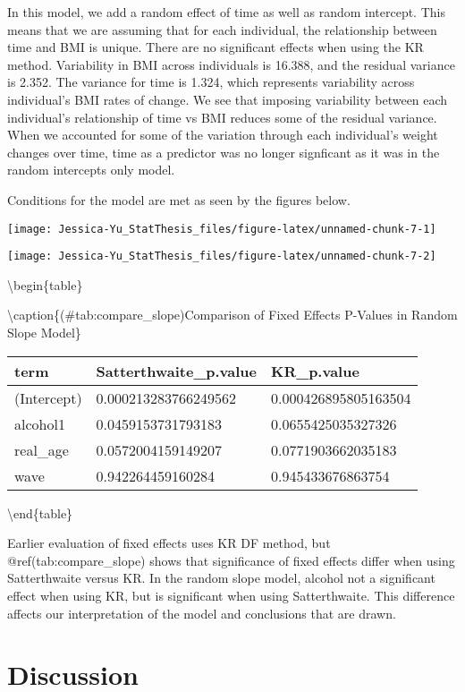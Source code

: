 \documentclass[12pt, twoside]{amherstthesis}
\begin{document}
In this model, we add a random effect of time as well as random intercept. This means that we are assuming that for each individual, the relationship between time and BMI is unique. There are no significant effects when using the KR method. Variability in BMI across individuals is 16.388, and the residual variance is 2.352. The variance for time is 1.324, which represents variability across individual's BMI rates of change. We see that imposing variability between each individual's relationship of time vs BMI reduces some of the residual variance. When we accounted for some of the variation through each individual's weight changes over time, time as a predictor was no longer signficant as it was in the random intercepts only model.

Conditions for the model are met as seen by the figures below.
\begin{center}\texttt{[image: Jessica-Yu\_StatThesis\_files/figure-latex/unnamed-chunk-7-1]} \end{center}
\begin{center}\texttt{[image: Jessica-Yu\_StatThesis\_files/figure-latex/unnamed-chunk-7-2]} \end{center}

\textbackslash begin\{table\}

\textbackslash caption\{(\#tab:compare\_slope)Comparison of Fixed Effects P-Values in Random Slope Model\}
\centering
\begin{tabular}[t]{l|l|l}
\hline
term & Satterthwaite\_p.value & KR\_p.value\\
\hline
(Intercept) & 0.000213283766249562 & 0.000426895805163504\\
\hline
alcohol1 & 0.0459153731793183 & 0.0655425035327326\\
\hline
real\_age & 0.0572004159149207 & 0.0771903662035183\\
\hline
wave & 0.942264459160284 & 0.945433676863754\\
\hline
\end{tabular}
\textbackslash end\{table\}

Earlier evaluation of fixed effects uses KR DF method, but @ref(tab:compare\_slope) shows that significance of fixed effects differ when using Satterthwaite versus KR. In the random slope model, alcohol not a significant effect when using KR, but is significant when using Satterthwaite. This difference affects our interpretation of the model and conclusions that are drawn.

\hypertarget{discussion-1}{%
\section{Discussion}\label{discussion-1}}
\end{document}
